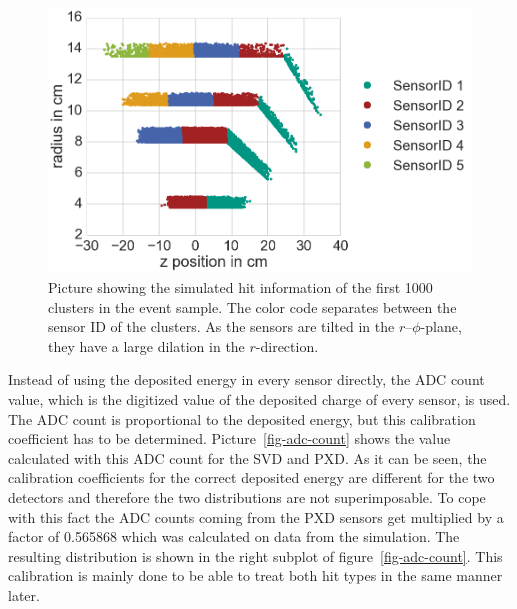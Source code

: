 \begin{figure}
 \centering
 \includegraphics[width=0.7\linewidth]{figures/vxd/cluster_positions.png}
 \caption[Picture showing the simulated hit information.]{Picture showing the simulated hit information of the first 1000 clusters in the event sample. The color code separates between the sensor ID of the clusters. As the sensors are tilted in the $r$--$\phi$-plane, they have a large dilation in the $r$-direction.}
 \label{fig-cluster-position}
\end{figure}

Instead of using the deposited energy in every sensor directly, the ADC count value, which is the digitized value of the deposited charge of every sensor, is used. The ADC count is proportional to the deposited energy, but this calibration coefficient has to be determined. %
Picture~\ref{fig-adc-count} shows the \dedx value calculated with this ADC count for the SVD and PXD. As it can be seen, the calibration coefficients for the correct deposited energy are different for the two detectors and therefore the two distributions are not superimposable. To cope with this fact the ADC counts coming from the PXD sensors get multiplied by a factor of 0.565868 which was calculated on data from the simulation. The resulting distribution is shown in the right subplot of figure~\ref{fig-adc-count}. This calibration is mainly done to be able to treat both hit types in the same manner later. 

